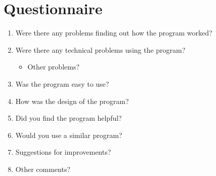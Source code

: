 \chapter{Questionnaire}
\label{chap:questionnaire}
\begin{enumerate}
\item Were there any problems finding out how the program worked?

\item Were there any technical problems using the program?
\begin{itemize}
\item Other problems?
\end{itemize}
\item Was the program easy to use?

\item How was the design of the program?

\item Did you find the program helpful?

\item Would you use a similar program?

\item Suggestions for improvements?

\item Other comments?
\end{enumerate}
